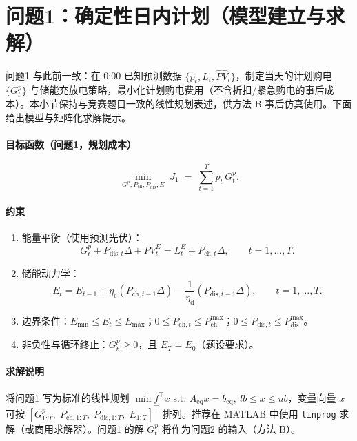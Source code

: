 \documentclass[12pt]{article}
\begin{document}
\section{问题1：确定性日内计划（模型建立与求解）}
问题1 与此前一致：在 0:00 已知预测数据 $\{p_t, L_t, \widehat{PV}_t\}$，制定当天的计划购电 $\{G^p_t\}$ 与储能充放电策略，最小化计划购电费用（不含折扣/紧急购电的事后成本）。本小节保持与竞赛题目一致的线性规划表述，供方法 B 事后仿真使用。下面给出模型与矩阵化求解提示。

\paragraph{目标函数（问题1，规划成本）}
\begin{equation}
\min_{G^p,P_{\mathrm{ch}},P_{\mathrm{dis}},E}\; J_1 \;=\; \sum_{t=1}^{T} p_t\,G^p_t.
\end{equation}

\paragraph{约束}
\begin{enumerate}
  \item 能量平衡（使用预测光伏）：
  \begin{equation}
  G^p_t + P_{\mathrm{dis},t}\Delta + PV_t^E = L_t^E + P_{\mathrm{ch},t}\Delta,\qquad t=1,\dots,T.
  \end{equation}
  \item 储能动力学：
  \begin{equation}
  E_t = E_{t-1} + \eta_{\mathrm{c}}(P_{\mathrm{ch},t-1}\Delta) - \frac{1}{\eta_{\mathrm{d}}}(P_{\mathrm{dis},t-1}\Delta),\qquad t=1,\dots,T.
  \end{equation}
  \item 边界条件：$E_{\min}\le E_t\le E_{\max}$；$0\le P_{\mathrm{ch},t}\le P_{\mathrm{ch}}^{\max}$；$0\le P_{\mathrm{dis},t}\le P_{\mathrm{dis}}^{\max}$。
  \item 非负性与循环终止：$G^p_t\ge0$，且 $E_T=E_0$（题设要求）。
\end{enumerate}

\paragraph{求解说明}
将问题1 写为标准的线性规划 $\min f^\top x$ s.t. $A_{\mathrm{eq}}x=b_{\mathrm{eq}},\ lb\le x\le ub$，变量向量 $x$ 可按 $[G^p_{1:T},\; P_{\mathrm{ch},1:T},\; P_{\mathrm{dis},1:T},\; E_{1:T}]^\top$ 排列。推荐在 MATLAB 中使用 \texttt{linprog} 求解（或商用求解器）。问题1 的解 $G^p_t$ 将作为问题2 的输入（方法 B）。
\end{document}
